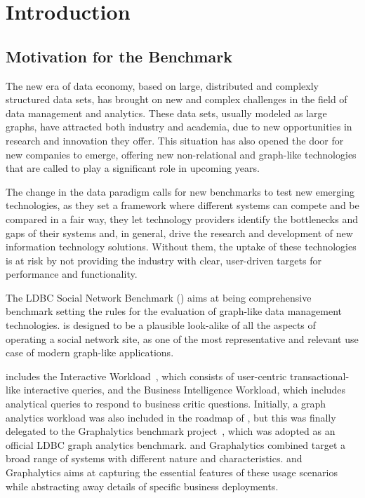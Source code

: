 \chapter{Introduction}
\label{section:introduction}


\section{Motivation for the Benchmark}

The new era of data economy, based on large, distributed and complexly
structured data sets, has brought on new and complex challenges in the field of
data management and analytics. These data sets, usually modeled as large
graphs, have attracted both industry and academia, due to new
opportunities in research and innovation they offer.  This situation has also
opened the door for new companies to emerge, offering new non-relational and
graph-like technologies that are called to play a significant role in upcoming
years.

The change in the data paradigm calls for new benchmarks to test new
emerging technologies, as they set a framework where different systems can
compete and be compared in a fair way, they let technology providers identify
the bottlenecks and gaps of their systems and, in general, drive the research
and development of new information technology solutions. Without them, the
uptake of these technologies is at risk by not providing the industry with
clear, user-driven targets for performance and functionality.

The LDBC Social Network Benchmark (\ldbcsnb) aims at being comprehensive
benchmark setting the rules for the evaluation of graph-like data management
technologies.  \ldbcsnb is designed to be a plausible look-alike of all the
aspects of operating a social network site, as one of the most representative
and relevant use case of modern graph-like applications. 

\ldbcsnb includes the Interactive
Workload~\cite{DBLP:conf/sigmod/ErlingALCGPPB15}, which consists of user-centric
transactional-like interactive queries, and the Business Intelligence Workload,
which includes analytical queries to respond to business critic questions.
Initially, a graph analytics workload was also included in the roadmap of
\ldbcsnb, but this was finally delegated to the Graphalytics benchmark
project~\cite{graphalytics}, which was adopted as an official LDBC graph
analytics benchmark. \ldbcsnb and Graphalytics combined target a broad range of
systems with different nature and characteristics.  \ldbcsnb and Graphalytics
aims at capturing the essential features of these usage scenarios while
abstracting away details of specific business deployments.

